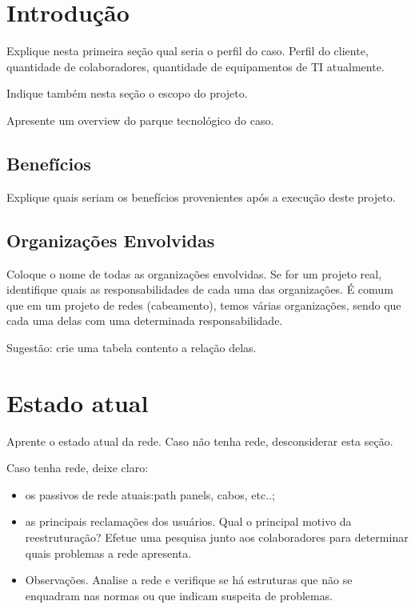 \documentclass[	DIV=calc,%
							paper=a4,%
							fontsize=12pt,%
							onecolumn]{scrartcl}	 					%
\begin{document}
\section{Introdução}
Explique nesta primeira seção qual seria o perfil do caso. Perfil do cliente, quantidade de colaboradores, quantidade de equipamentos de TI atualmente.

Indique também nesta seção o escopo do projeto.

Apresente um overview do parque tecnológico do caso.
\subsection{Benefícios}
Explique quais seriam os benefícios provenientes após a execução deste projeto.

\subsection{Organizações Envolvidas}
Coloque o nome de todas as organizações envolvidas. Se for um projeto real, identifique quais as responsabilidades de cada uma das organizações. É comum que em um projeto de redes (cabeamento), temos várias organizações, sendo que cada uma delas com uma determinada responsabilidade.

Sugestão: crie uma tabela contento a relação delas.



\section{Estado atual}
Aprente o estado atual da rede. Caso não tenha rede, desconsiderar esta seção.

Caso tenha rede, deixe claro:
\begin{itemize}
	\item os passivos de rede atuais:path panels, cabos, etc..;
	\item as principais reclamações dos usuários. Qual o principal motivo da reestruturação? Efetue uma pesquisa junto aos colaboradores para determinar quais problemas a rede apresenta.
	\item Observações. Analise a rede e verifique se há estruturas que não se enquadram nas normas ou que indicam suspeita de problemas.
\end{itemize}
\end{document}
